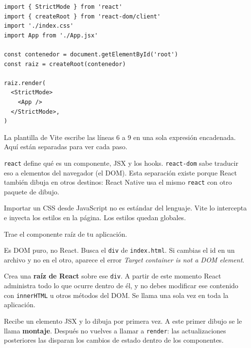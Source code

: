 \documentclass[11pt,a4paper]{article}
\newcommand{\cmd}[1]{\texttt{\color{reactdark}#1}}
\begin{document}
\begin{lstlisting}[language=JSX,title={\small\ttfamily src/main.jsx}]
import { StrictMode } from 'react'
import { createRoot } from 'react-dom/client'
import './index.css'
import App from './App.jsx'

const contenedor = document.getElementById('root')
const raiz = createRoot(contenedor)

raiz.render(
  <StrictMode>
    <App />
  </StrictMode>,
)
\end{lstlisting}

La plantilla de Vite escribe las líneas 6 a 9 en una sola expresión encadenada. Aquí están separadas para ver cada paso.

\begin{description}[leftmargin=0pt, style=nextline, itemsep=0.5em]
\item[Líneas 1 y 2: dos paquetes distintos.]
\cmd{react} define qué es un componente, JSX y los hooks. \cmd{react-dom} sabe traducir eso a elementos del navegador (el DOM). Esta separación existe porque React también dibuja en otros destinos: React Native usa el mismo \cmd{react} con otro paquete de dibujo.

\item[Línea 3: \texttt{import './index.css'}.]
Importar un CSS desde JavaScript no es estándar del lenguaje. Vite lo intercepta e inyecta los estilos en la página. Los estilos quedan globales.

\item[Línea 4: \texttt{import App}.]
Trae el componente raíz de tu aplicación.

\item[Línea 6: \texttt{document.getElementById('root')}.]
Es DOM puro, no React. Busca el \cmd{div} de \cmd{index.html}. Si cambias el id en un archivo y no en el otro, aparece el error \emph{Target container is not a DOM element}.

\item[Línea 7: \texttt{createRoot(contenedor)}.]
Crea una \textbf{raíz de React} sobre ese \cmd{div}. A partir de este momento React administra todo lo que ocurre dentro de él, y no debes modificar ese contenido con \cmd{innerHTML} u otros métodos del DOM. Se llama una sola vez en toda la aplicación.

\item[Línea 9: \texttt{raiz.render(...)}.]
Recibe un elemento JSX y lo dibuja por primera vez. A este primer dibujo se le llama \textbf{montaje}. Después no vuelves a llamar a \cmd{render}: las actualizaciones posteriores las disparan los cambios de estado dentro de los componentes.


\end{description}
\end{document}
